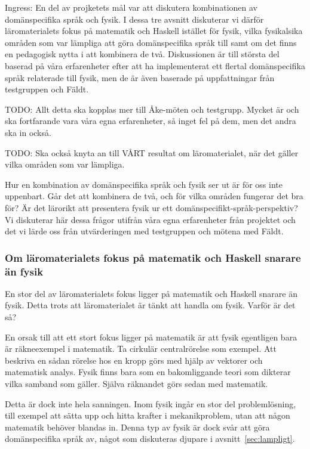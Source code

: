 \begin{binge}
Ingress: En del av projketets mål var att diskutera kombinationen av domänspecifika språk och fysik. I dessa tre avsnitt diskuterar vi därför läromaterialets fokus på matematik och Haskell istället för fysik, vilka fysikalsika områden som var lämpliga att göra domänspecifika språk till samt om det finns en pedagogisk nytta i att kombinera de två. Diskussionen är till största del baserad på våra erfarenheter efter att ha implementerat ett flertal domänspecifika språk relaterade till fysik, men de är även baserade på uppfattningar från testgruppen och Fäldt.


TODO: Allt detta ska kopplas mer till Åke-möten och testgrupp. Mycket är och ska fortfarande vara våra egna erfarenheter, så inget fel på dem, men det andra ska in också.

TODO: Ska också knyta an till VÅRT resultat om läromaterialet, när det gäller vilka områden som var lämpliga.

Hur en kombination av domänspecifika språk och fysik ser ut är för oss inte uppenbart. Går det att kombinera de två, och för vilka områden fungerar det bra för? Är det lärorikt att presentera fysik ur ett domänspecifikt-språk-perspektiv? Vi diskuterar här dessa frågor utifrån våra egna erfarenheter från projektet och det vi lärde oss från utvärderingen med testgruppen och mötena med Fäldt. 

\subsubsection{Om läromaterialets fokus på matematik och Haskell snarare än fysik}

En stor del av läromaterialets fokus ligger på matematik och Haskell snarare än fysik. Detta trots att läromaterialet är tänkt att handla om fysik. Varför är det så?

En orsak till att ett stort fokus ligger på matematik är att fysik egentligen bara är räkneexempel i matematik. Ta cirkulär centralrörelse som exempel. Att beskriva en sådan rörelse hos en kropp görs med hjälp av vektorer och matematisk analys. Fysik finns bara som en bakomliggande teori som dikterar vilka samband som gäller. Själva räknandet görs sedan med matematik.

Detta är dock inte hela sanningen. Inom fysik ingår en stor del problemlösning, till exempel att sätta upp och hitta krafter i mekanikproblem, utan att någon matematik behöver blandas in. Denna typ av fysik är dock svår att göra domänspecifika språk av, något som diskuteras djupare i avsnitt~\ref{sec:lampligt}.


\end{binge}
